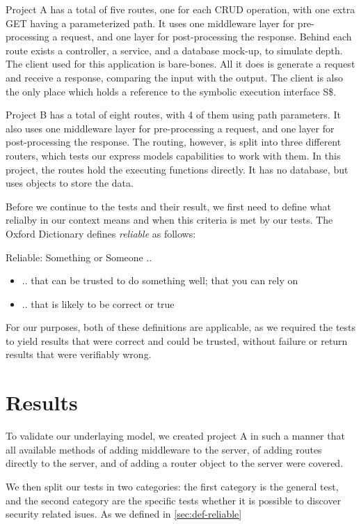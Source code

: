 Project A has a total of five routes, one for each CRUD operation, with one extra GET having a parameterized path.
It uses one middleware layer for pre-processing a request, and one layer for post-processing the response. Behind each route exists a controller, a service, and a database mock-up, to simulate depth. 
The client used for this application is bare-bones. All it does is generate a request and receive a response, comparing the input with the output. The client is also the only place which holds a reference to the symbolic execution interface S\$.

Project B has a total of eight routes, with 4 of them using path parameters.
It also uses one middleware layer for pre-processing a request, and one layer for post-processing the response. The routing, however, is split into three different routers, which tests our express models capabilities to work with them. In this project, the routes hold the executing functions directly. It has no database, but uses objects to store the data.

Before we continue to the tests and their result, we first need to define what relialby in our context means and when this criteria is met by our tests.
The Oxford Dictionary defines \textit{reliable} as follows:
\begin{definition}
Reliable:  Something or Someone .. 
  \begin{itemize}
    \item .. that can be trusted to do something well; that you can rely on
    \item .. that is likely to be correct or true
  \end{itemize}
\end{definition}
\label{sec:def-reliable}
For our purposes, both of these definitions are applicable, as we required the tests to yield results that were correct and could be trusted, without failure or return results that were verifiably wrong.

\section{Results}
\label{sec:results}

To validate our underlaying model, we created project A in such a manner that all available methods of adding middleware to the server, of adding routes directly to the server, and of adding a router object to the server were covered. 

We then split our tests in two categories: the first category is the general test, and the second category are the specific tests whether it is possible to discover security related isues.
As we defined in \autoref{sec:def-reliable}


